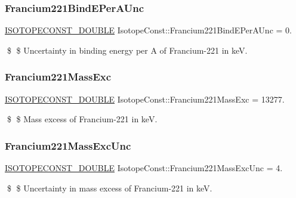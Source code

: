 \subsubsection{\texorpdfstring{Francium221\+Bind\+E\+Per\+A\+Unc}{Francium221BindEPerAUnc}}
{\footnotesize\ttfamily \mbox{\hyperlink{group___isotope_const-_macros_ga8f45a7272ce02c0b4c65c44636ed719a}{I\+S\+O\+T\+O\+P\+E\+C\+O\+N\+S\+T\+\_\+\+D\+O\+U\+B\+LE}} Isotope\+Const\+::\+Francium221\+Bind\+E\+Per\+A\+Unc = 0.}

\$ \$ Uncertainty in binding energy per A of Francium-\/221 in keV. \mbox{\label{group___isotope_const-_francium-_fr221_ga5571fe2c3f8d8a64c99244832698c54f}} 
\subsubsection{\texorpdfstring{Francium221\+Mass\+Exc}{Francium221MassExc}}
{\footnotesize\ttfamily \mbox{\hyperlink{group___isotope_const-_macros_ga8f45a7272ce02c0b4c65c44636ed719a}{I\+S\+O\+T\+O\+P\+E\+C\+O\+N\+S\+T\+\_\+\+D\+O\+U\+B\+LE}} Isotope\+Const\+::\+Francium221\+Mass\+Exc = 13277.}

\$ \$ Mass excess of Francium-\/221 in keV. \mbox{\label{group___isotope_const-_francium-_fr221_gac17588eb4cd47058fd496757872d93c8}} 
\subsubsection{\texorpdfstring{Francium221\+Mass\+Exc\+Unc}{Francium221MassExcUnc}}
{\footnotesize\ttfamily \mbox{\hyperlink{group___isotope_const-_macros_ga8f45a7272ce02c0b4c65c44636ed719a}{I\+S\+O\+T\+O\+P\+E\+C\+O\+N\+S\+T\+\_\+\+D\+O\+U\+B\+LE}} Isotope\+Const\+::\+Francium221\+Mass\+Exc\+Unc = 4.}

\$ \$ Uncertainty in mass excess of Francium-\/221 in keV. \mbox{\label{group___isotope_const-_francium-_fr221_ga4bfdf48f7df1bcd8247afb17a6a1fed4}} 

